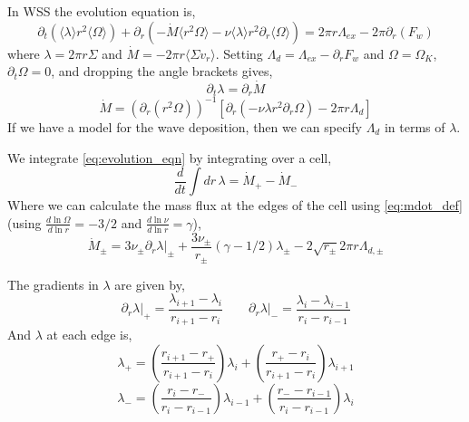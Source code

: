 \documentclass{article}
\begin{document}
In WSS the evolution equation is,
\begin{equation}
\partial_t(\langle \lambda \rangle r^2 \langle \Omega \rangle) + \partial_r( -\dot{M}  \langle r^2 \Omega \rangle  - \nu \langle \lambda \rangle  r^2 \partial_r \langle \Omega \rangle) = 2\pi r \Lambda_{ex} - 2 \pi \partial_r (F_w) 
\end{equation}
where $\lambda = 2\pi r \Sigma$ and $\dot{M} = -2\pi r\langle \Sigma v_r\rangle$. Setting $\Lambda_d = \Lambda_{ex} - \partial_r F_w$ and $\Omega = \Omega_K$, $\partial_t \Omega = 0$, and dropping the angle brackets gives,
\begin{equation} \label{eq:evolution_eqn}
\partial_t \lambda = \partial_r \dot{M}
\end{equation}
\begin{equation} \label{eq:mdot_def}
\dot{M} = \left( \partial_r (r^2 \Omega) \right)^{-1} \left[ \partial_r(- \nu \lambda r^2 \partial_r \Omega ) - 2 \pi r \Lambda_d \right]
\end{equation}
If we have a model for the wave deposition, then we can specify $\Lambda_d$ in terms of $\lambda$. 

We integrate \eqref{eq:evolution_eqn} by integrating over a cell,
\begin{equation}
\frac{d}{dt} \int dr \, \lambda = \dot{M}_+ - \dot{M}_-
\end{equation}          
Where we can calculate the mass flux at the edges of the cell using \eqref{eq:mdot_def} (using $ \frac{d \ln \Omega}{d \ln r} = -3/2$ and $\frac{d \ln \nu}{d \ln r} = \gamma$),
\begin{equation}
\dot{M}_\pm = 3 \nu_\pm \left. \partial_r \lambda \right|_\pm +  \frac{3 \nu_\pm}{r_\pm} \left( \gamma -1/2\right) \lambda_\pm - 2 \sqrt{r_\pm} 2 \pi r \Lambda_{d,\pm}
\end{equation}

The gradients in $\lambda$ are given by,
\begin{equation}
\left. \partial_r \lambda \right|_+ = \frac{ \lambda_{i+1} - \lambda_i}{r_{i+1} - r_{i}} \qquad \left. \partial_r \lambda \right|_- = \frac{ \lambda_{i} - \lambda_{i-1}}{r_{i} - r_{i-1}}
\end{equation}
And $\lambda$ at each edge is,
\begin{equation}
\lambda_+ = \left( \frac{ r_{i+1} -r_+}{r_{i+1}-r_i} \right) \lambda_i + \left( \frac{r_+ - r_i}{r_{i+1}-r_i} \right) \lambda_{i+1}
\end{equation}
\begin{equation}
\lambda_- = \left( \frac{ r_{i} -r_-}{r_{i}-r_{i-1}} \right) \lambda_{i-1} + \left( \frac{r_- - r_{i-1}}{r_{i}-r_{i-1}} \right) \lambda_{i}
\end{equation}
\end{document}
